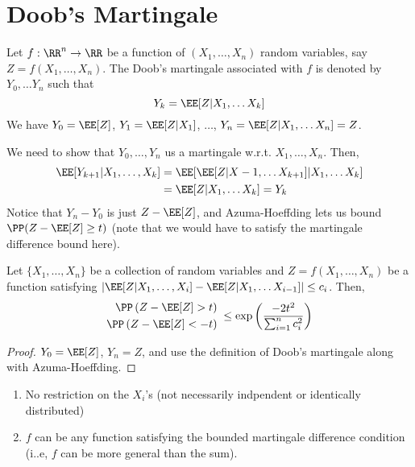 \section{Doob's Martingale}
\begin{definition}
Let $f: \RR^n \to \RR$ be a function of $(X_1, \dots, X_n)$ random variables, say $Z = f(X_1, \dots, X_n)$. The Doob's martingale associated with $f$ is denoted by $Y_0, \dots Y_n$ such that 
\begin{equation}
    Y_k = \EE[Z | X_1, \dots X_k]
\end{equation}
We have $Y_0= \EE[Z]$, $Y_1 = \EE[Z|X_1]$, $\dots$, $Y_n = \EE[Z|X_1, \dots X_n] = Z$.
\end{definition}
\begin{note}
We need to show that $Y_0, \dots, Y_n$ us a martingale w.r.t. $X_1, \dots, X_n$. Then,
\begin{align*}
\EE[Y_{k+1} | X_1, \dots, X_k] &= \EE[\EE[Z|X-1, \dots X_{k+1}] | X_1, \dots X_k] \\
&= \EE[Z | X_1, \dots X_k] = Y_k
\end{align*}
Notice that $Y_n - Y_0$ is just $Z - \EE[Z]$, and Azuma-Hoeffding lets us bound $\PP(Z - \EE[Z] \geq t)$ (note that we would have to satisfy the martingale difference bound here).
\end{note}
\begin{corollary}
Let $\{X_1, \dots, X_n\}$ be a collection of random variables and $Z = f(X_1, \dots, X_n)$ be a function satisfying $|\EE[Z|X_1, \dots, X_i] - \EE[Z|X_1, \dots X_{i-1}]| \leq c_i$. Then,
\begin{equation}
\begin{split}
    \PP\left(Z - \EE[Z] > t\right)& \\
    \PP\left(Z - \EE[Z] < -t\right)
\end{split}
\; \leq \exp\left(
\frac{-2t^2}{\sum_{i=1}^n c_i^2}\right)
\end{equation}
\end{corollary}
\begin{proof}
$Y_0 = \EE[Z]$, $Y_n = Z$, and use the definition of Doob's martingale along with Azuma-Hoeffding.
\end{proof}
\begin{remark}
\begin{enumerate}[label=(\roman*)]
    \item No restriction on the $X_i$'s (not necessarily indpendent or identically distributed)
    \item $f$ can be any function satisfying the bounded martingale difference condition (i..e, $f$ can be more general than the sum).
\end{enumerate}
\end{remark}
